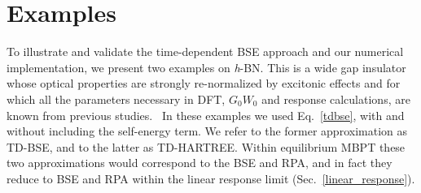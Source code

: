 

 







\section{Examples}
\label{computational}                                        
To illustrate and validate the time-dependent BSE approach and
our numerical implementation, 
we present two examples on {\it h}-BN. This is a wide gap insulator whose optical properties are
strongly re-normalized by excitonic effects and for which all the
parameters necessary in DFT, $G_0W_0$ and response calculations,
are known from previous studies.~\cite{PhysRevLett.96.126104,PhysRevLett.100.189701,attaccalite} 
In these examples we used Eq.~\eqref{tdbse}, with and without
including the self-energy term. We refer to the
former approximation as TD-BSE, and to the latter as
TD-HARTREE. Within equilibrium MBPT these two approximations
would correspond to the BSE and RPA, and in fact they reduce to BSE and RPA
within the linear response limit (Sec.~\ref{linear_response}).   

